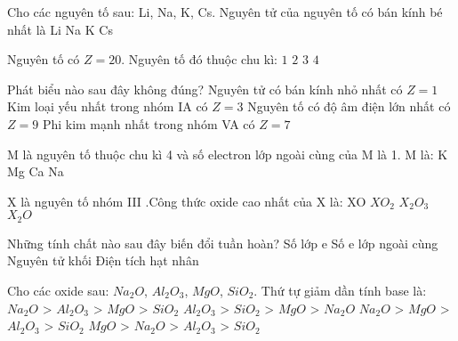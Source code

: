 \documentclass[Main_HOA10.tex]{subfiles}
\begin{document}
\begin{ex}%
	Cho các nguyên tố sau: Li, Na, K, Cs. Nguyên tử của nguyên tố có bán kính bé nhất là
	\choice
	{Li}
	{Na}
	{K}
	{Cs}
\end{ex}
\begin{ex}%
	Nguyên tố có $Z=20$. Nguyên tố đó thuộc chu kì:
	\choice
	{$1$}
	{$2$}
	{$3$}
	{$4$}
\end{ex}
\begin{ex}%
	Phát biểu nào sau đây không đúng?
	\choice
	{\True Nguyên tử có bán kính nhỏ nhất có $Z=1$}
	{Kim loại yếu nhất trong nhóm IA có $Z=3$}
	{Nguyên tố có độ âm điện lớn nhất có $Z=9$}
	{Phi kim mạnh nhất trong nhóm VA có $Z=7$}
\end{ex}
\begin{ex}%
	M là nguyên tố thuộc chu kì 4 và số electron lớp ngoài cùng của M là 1. M là:
	\choice
	{\True K}
	{Mg}
	{Ca}
	{Na}
\end{ex}
\begin{ex}%
	X là nguyên tố nhóm III .Công thức oxide cao nhất của X là:
	\choice
	{XO}
	{$XO_2$}
	{\True $X_2O_3$}
	{$X_2O$}
\end{ex}
\begin{ex}%
	Những tính chất nào sau đây biến đổi tuần hoàn?
	\choice
	{Số lớp e}
	{\True Số e lớp ngoài cùng}
	{Nguyên tử khối}
	{Điện tích hạt nhân}
\end{ex}
\begin{ex}%
	Cho các oxide sau:  $Na_2O$,  $Al_2O_3$, $MgO$,  $SiO_2$.
	Thứ tự giảm dần tính base là:
	\choice
	{$Na_2O$ >  $Al_2O_3$ > $MgO$ >  $SiO_2$}
	{$Al_2O_3$ >  $SiO_2$ > $MgO$ >  $Na_2O$}
	{$Na_2O$ > $MgO$ >  $Al_2O_3$ >  $SiO_2$}
	{$MgO$ >  $Na_2O$ >  $Al_2O_3$ >  $SiO_2$}
\end{ex}
\end{document}
